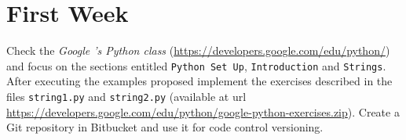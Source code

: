 \documentclass[12pt]{article} %
\begin{document}

\section{First Week}
Check the \textit{Google 's Python class} (\url{https://developers.google.com/edu/python/}) and focus on the sections entitled \texttt{Python Set Up}, \texttt {Introduction} and \texttt{Strings}. After executing the examples proposed  implement the exercises described in the files \texttt{string1.py} and \texttt{string2.py} (available at url \url{https://developers.google.com/edu/python/google-python-exercises.zip}). Create a Git repository in Bitbucket and use it for code control versioning.
\end{document}
